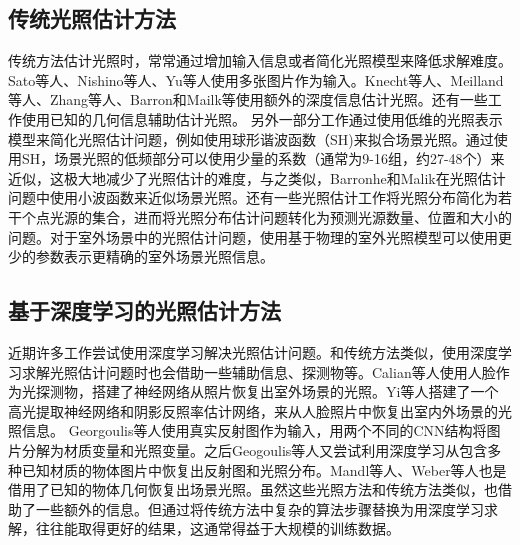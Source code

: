 \subsection{传统光照估计方法}
传统方法估计光照时，常常通过增加输入信息或者简化光照模型来降低求解难度。Sato等人\cite{sato1999acquiring}、Nishino\cite{nishino2001determining}等人、Yu\cite{yu2006sparse}等人使用多张图片作为输入。Knecht\cite{knecht2012reciprocal}等人、Meilland\cite{meilland20133d}等人、Zhang等人\cite{zhang2016emptying}、Barron和Mailk\cite{barron2013intrinsic}等使用额外的深度信息估计光照。还有一些工作使用已知的几何信息辅助估计光照\cite{ramamoorthi2001signal, sato2003illumination, li2003multiple}。
另外一部分工作通过使用低维的光照表示模型来简化光照估计问题，例如使用球形谐波函数（SH)来拟合场景光照\cite{ramamoorthi2001signal,kemelmacher20113d,garrido2013reconstructing,
knorr2014real,li2014intrinsic,barron2015shape, rematas2016deep}。通过使用SH，场景光照的低频部分可以使用少量的系数（通常为9-16组，约27-48个）来近似，这极大地减少了光照估计的难度，与之类似，Barronhe和Malik\cite{okabe2004spherical}在光照估计问题中使用小波函数来近似场景光照。还有一些光照估计工作\cite{sato1999acquiring,  panagopoulos2011illumination, wang2002estimation, li2003multiple, sato2003illumination}将光照分布简化为若干个点光源的集合，进而将光照分布估计问题转化为预测光源数量、位置和大小的问题。对于室外场景中的光照估计问题，使用基于物理的室外光照模型\cite{lalonde2008does, lalonde2010sun, lalonde2012estimating, sunkavalli2008color}可以使用更少的参数表示更精确的室外场景光照信息。
\subsection{基于深度学习的光照估计方法}

近期许多工作尝试使用深度学习解决光照估计问题。和传统方法类似，使用深度学习求解光照估计问题时也会借助一些辅助信息、探测物等。Calian等人\cite{calian2018faces}使用人脸作为光探测物，搭建了神经网络从照片恢复出室外场景的光照。Yi等人\cite{yi2018faces}搭建了一个高光提取神经网络和阴影反照率估计网络，来从人脸照片中恢复出室内外场景的光照信息。
Georgoulis等人\cite{georgoulis2016delight}使用真实反射图作为输入，用两个不同的CNN结构将图片分解为材质变量和光照变量。之后Geogoulis等人\cite{georgoulis2016natural}又尝试利用深度学习从包含多种已知材质的物体图片中恢复出反射图和光照分布。Mandl等人\cite{mandl2017learning}、Weber等人\cite{weber2018learning}也是借用了已知的物体几何恢复出场景光照。虽然这些光照方法和传统方法类似，也借助了一些额外的信息。但通过将传统方法中复杂的算法步骤替换为用深度学习求解，往往能取得更好的结果，这通常得益于大规模的训练数据。


